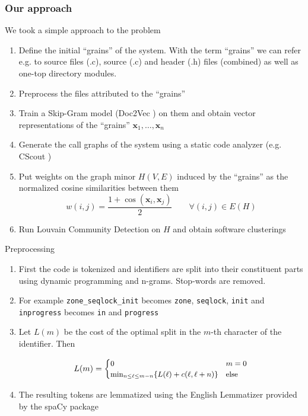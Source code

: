 \documentclass{beamer}
\renewcommand{\vec}{\mathbf}
\begin{document}
\begin{frame}[allowframebreaks]
\frametitle{Our approach}

We took a simple approach to the problem
\begin{enumerate}
    \item Define the initial ``grains'' of the system. With the term ``grains'' we can refer e.g. to source files (.c), source (.c) and header (.h) files (combined) as well as one-top directory modules. 
    \item Preprocess the files attributed to the ``grains''
    \item Train a Skip-Gram model (Doc2Vec \cite{doc2vec}) on them and obtain vector representations of the ``grains'' $\vec x_1, \dots, \vec x_n$
    \item Generate the call graphs of the system using a static code analyzer (e.g. CScout \cite{cscout})
    
    \framebreak
    \item Put weights on the graph minor $H(V, E)$ induced by the ``grains'' as the normalized cosine similarities between them $$w(i, j) = \frac {1 + \cos(\vec x_i, \vec x_j)} 2 \qquad \forall (i, j) \in E(H)$$
    
    \item Run Louvain Community Detection on $H$ and obtain software clusterings
\end{enumerate}
    
\end{frame}

\begin{frame}{Preprocessing}

\begin{enumerate}
    \item First the code is tokenized and identifiers are split into their constituent parts using dynamic programming and n-grams. Stop-words are removed. 
    
    \item For example \texttt{zone\_seqlock\_init} becomes \texttt{zone}, \texttt{seqlock}, \texttt{init} and \texttt{inprogress} becomes \texttt{in} and \texttt{progress}
    
    \item Let $L(m)$ be the cost of the optimal split in the $m$-th character of the identifier. Then 

    $$\small L(m) = 
    \begin{cases}
	0 & m = 0 \\
	\min_{n \le \ell \le m - n} \{ L(\ell) + c(\ell, \ell + n) \} & \text{else} 
	

\end{cases}
$$

	\item The resulting tokens are lemmatized using the English Lemmatizer provided by the spaCy \cite{spacy} package

\end{enumerate}



\end{frame}
\end{document}
